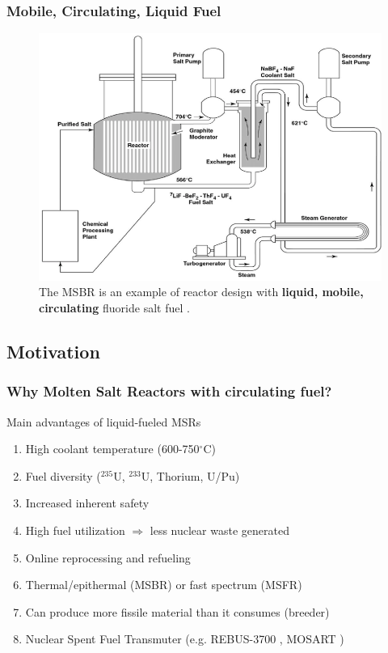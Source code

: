 \begin{frame}
  \frametitle{Mobile, Circulating, Liquid Fuel}
               \begin{figure}[t]
                \includegraphics[height=0.58\textwidth]{./images/msbr_scheme.png}
                \caption{The \gls{MSBR} is an example of reactor design with \textbf{liquid, mobile, circulating} fluoride salt fuel \cite{rosenthal_molten-salt_1970}.}
             \end{figure}   
  
\end{frame}

\subsection{Motivation}
\begin{frame}
  \frametitle{Why Molten Salt Reactors with circulating fuel?}
              \begin{block}{Main advantages of liquid-fueled \glspl{MSR} \cite{elsheikh_safety_2013}}
               \begin{enumerate}
                \item High coolant temperature (600-750$^{\circ}$C)
                \item Fuel diversity ($^{235}$U, $^{233}$U, Thorium, U/Pu)
                \item Increased inherent safety
                \item High fuel utilization $\Rightarrow$ less nuclear waste generated
                \item Online reprocessing and refueling
                \item Thermal/epithermal (\gls{MSBR}) or fast spectrum (\gls{MSFR})
                \item Can produce more fissile material than it consumes (breeder)
                \item Nuclear Spent Fuel Transmuter (e.g. REBUS-3700 \cite{mourogov_potentialities_2006-1}, MOSART \cite{ignatiev_molten_2014}) 
               \end{enumerate}
               \end{block}

\end{frame}

